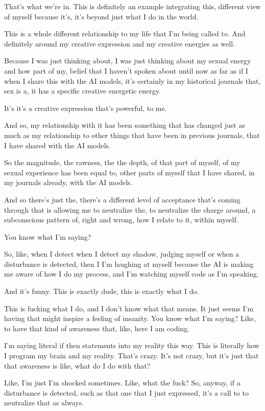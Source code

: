 \documentclass{article}
\begin{document}
That's what we're in. This is definitely an example integrating this,
different view of myself because it's, it's beyond just what I do in the
world.

This is a whole different relationship to my life that I'm being called
to. And definitely around my creative expression and my creative
energies as well.

Because I was just thinking about, I was just thinking about my sexual
energy and how part of my, belief that I haven't spoken about until now
as far as if I when I share this with the AI models, it's certainly in
my historical journals that, sex is a, it has a specific creative
energetic energy.

It's it's a creative expression that's powerful, to me.

And so, my relationship with it has been something that has changed just
as much as my relationship to other things that have been in previous
journals, that I have shared with the AI models.

So the magnitude, the rawness, the the depth, of that part of myself, of
my sexual experience has been equal to, other parts of myself that I
have shared, in my journals already, with the AI models.

And so there's just the, there's a different level of acceptance that's
coming through that is allowing me to neutralize the, to neutralize the
charge around, a subconscious pattern of, right and wrong, how I relate
to it, within myself.

You know what I'm saying?

So, like, when I detect when I detect my shadow, judging myself or when
a disturbance is detected, then I I'm laughing at myself because the AI
is making me aware of how I do my process, and I'm watching myself code
as I'm speaking.

And it's funny. This is exactly dude, this is exactly what I do.

This is fucking what I do, and I don't know what that means. It just
seems I'm having that might inspire a feeling of insanity. You know what
I'm saying? Like, to have that kind of awareness that, like, here I am
coding.

I'm saying literal if then statements into my reality this way. This is
literally how I program my brain and my reality. That's crazy. It's not
crazy, but it's just that that awareness is like, what do I do with
that?

Like, I'm just I'm shocked sometimes. Like, what the fuck? So, anyway,
if a disturbance is detected, such as that one that I just expressed,
it's a call to to neutralize that as always.
\end{document}
